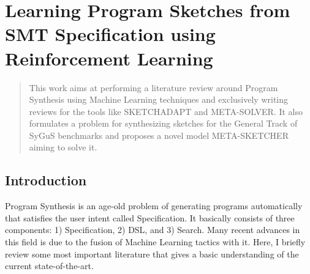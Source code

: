 \clearpage
\section{Learning Program Sketches from SMT Specification
using Reinforcement Learning}





%

\begin{abstract}
  This work aims at performing a literature review around Program Synthesis using Machine Learning techniques and exclusively writing reviews for the tools like SKETCHADAPT and META-SOLVER. It also formulates a problem for synthesizing sketches for the General Track of SyGuS benchmarks and proposes a novel model META-SKETCHER aiming to solve it. 
\end{abstract}

\subsection{Introduction}

Program Synthesis is an age-old problem of generating programs automatically that satisfies the user intent called Specification. It basically consists of three components: 1) Specification, 2) DSL, and 3) Search. Many recent advances in this field is due to the fusion of Machine Learning tactics with it. Here, I briefly review some most important literature that gives a basic understanding of the current state-of-the-art.

